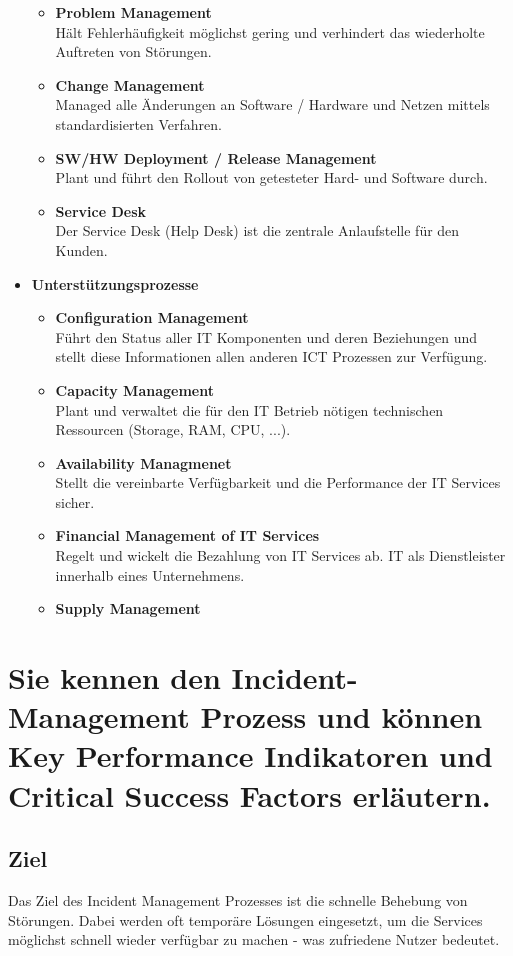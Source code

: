 \begin{itemize}
\begin{itemize}
		\item \textbf{Problem Management} \\
			Hält Fehlerhäufigkeit möglichst gering und verhindert das wiederholte Auftreten von Störungen.
		\item \textbf{Change Management} \\
			Managed alle Änderungen an Software / Hardware und Netzen mittels standardisierten Verfahren.		
		\item \textbf{SW/HW Deployment / Release Management} \\
			Plant und führt den Rollout von getesteter Hard- und Software durch.		
		\item \textbf{Service Desk} \\
			Der Service Desk (Help Desk) ist die zentrale Anlaufstelle für den Kunden.		
	\end{itemize}
	\item \textbf{Unterstützungsprozesse}
	\begin{itemize}
		\item \textbf{Configuration Management} \\
			Führt den Status aller IT Komponenten und deren Beziehungen und stellt diese Informationen allen anderen ICT Prozessen zur Verfügung.
		\item \textbf{Capacity Management} \\
			Plant und verwaltet die für den IT Betrieb nötigen technischen Ressourcen (Storage, RAM, CPU, ...).
		\item \textbf{Availability Managmenet} \\
			Stellt die vereinbarte Verfügbarkeit und die Performance der IT Services sicher.
		\item \textbf{Financial Management of IT Services} \\
			Regelt und wickelt die Bezahlung von IT Services ab. IT als Dienstleister innerhalb eines Unternehmens.
		\item \textbf{Supply Management}
	\end{itemize}
\end{itemize}

\section{Sie kennen den Incident-Management Prozess und können Key Performance Indikatoren und Critical Success Factors erläutern.}

\subsection{Ziel}
Das Ziel des Incident Management Prozesses  ist die schnelle Behebung von Störungen. Dabei werden oft temporäre Lösungen eingesetzt, um die Services möglichst schnell wieder verfügbar zu machen - was zufriedene Nutzer bedeutet.
